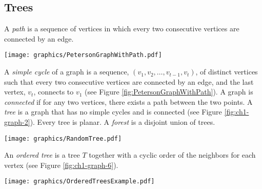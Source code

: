 \documentclass[10pt]{CSUNthesis}
\theoremstyle{plain}%
\theoremstyle{definition}
\theoremstyle{remark}
\begin{document}
\subsection{Trees}
A \textit{path} is a sequence of vertices in which every two consecutive vertices are connected by an edge.   
\noindent%
\begin{minipage}{\linewidth}
\begin{center}
\texttt{[image: graphics/PetersonGraphWithPath.pdf]}
\label{fig:PetersonGraphWithPath}
\end{center}
\end{minipage}
A \textit{simple cycle} of a graph is a sequence, $(v_1, v_2, \dots, v_{t-1},v_t)$, of distinct vertices such that every two consecutive vertices are connected by an edge,  and the last vertex, $v_t$, connects to $v_1$ (see Figure \ref{fig:PetersonGraphWithPath}).  
A graph is \textit{connected} if for any two vertices, there exists a path between the two points.
A \textit{tree} is a graph that has no simple cycles and is connected (see Figure \ref{fig:ch1-graph-2}).
Every tree is planar.
A \textit{forest} is a disjoint union of trees.  
\noindent%
\begin{minipage}{\linewidth}
\begin{center}
\texttt{[image: graphics/RandomTree.pdf]}
\label{fig:ch1-graph-2}
\end{center}
\end{minipage}

An \textit{ordered tree} is a tree $T$ together with a cyclic order of the neighbors for each vertex (see Figure \ref{fig:ch1-graph-6}).
\noindent%
\begin{minipage}{\linewidth}
\begin{center}
    \texttt{[image: graphics/OrderedTreesExample.pdf]}
    \label{fig:ch1-graph-6}
\end{center}
\end{minipage}
\end{document}
